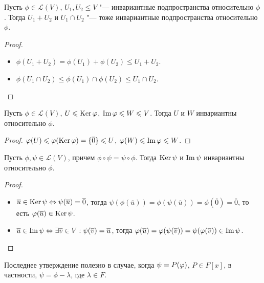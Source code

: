 \begin{proposition}
	Пусть $\phi \in \mathcal{L}(V)$, $U_1, U_2 \le V$ "--- инвариантные подпространства относительно $\phi$. Тогда $U_1 + U_2$ и $U_1 \cap U_2$ "--- тоже инвариантные подпространства относительно $\phi$.
\end{proposition}

\begin{proof}~
	\begin{itemize}
		\item $\phi(U_1 + U_2) = \phi(U_1) + \phi(U_2) \le U_1 + U_2$.
		\item $\phi(U_1 \cap U_2) \le \phi(U_1) \cap \phi(U_2) \le U_1 \cap U_2$.\qedhere
	\end{itemize}
\end{proof}

\begin{proposition}
	Пусть $\phi \in \mathcal{L}(V)$, $U \leqslant \operatorname{Ker}{\varphi}$, $\operatorname{Im}{\varphi} \leqslant W \leqslant V$. Тогда $U$ и $W$ инвариантны относительно $\phi$.
\end{proposition}

\begin{proof}
	$\varphi(U) \leqslant \varphi(\operatorname{Ker}{\varphi}) = \{\overline{0}\} \leqslant U$, $\phi(W) \le \im{\phi} \hm{\le} W$.
\end{proof}

\begin{proposition}
	Пусть $\phi, \psi \in \mathcal{L}(V)$, причем $\phi \circ \psi = \psi \circ \phi$. Тогда $\operatorname{Ker}{\psi}$ и $\operatorname{Im}{\psi}$ инвариантны относительно $\phi$.
\end{proposition}

\begin{proof}~
	\begin{itemize}
		\item $\overline{u} \in \operatorname{Ker}{\psi} \Leftrightarrow \psi(\overline{u}) = \overline{0}$, тогда $\psi(\phi(\overline{u})) = \phi(\psi(\overline{u})) = \phi(\overline{0}) = \overline{0}$, то есть $\varphi(\overline{u}) \in \operatorname{Ker}{\psi}$.
		\item $\overline{u} \in \operatorname{Im}{\psi} \Leftrightarrow \exists \overline{v} \in V: \psi(\overline{v}) = \overline{u}$, тогда $\phi(\overline{u}) = \phi(\psi(\overline{v})) \hm{=} \psi(\phi(\overline{v})) \in \im{\psi}$.\qedhere
	\end{itemize}
\end{proof}

\begin{note}
	Последнее утверждение полезно в случае, когда $\psi \hm{=} P(\phi)$, $P \in F[x]$, в частности, $\psi = \phi - \lambda$, где $\lambda \in F$.
\end{note}

